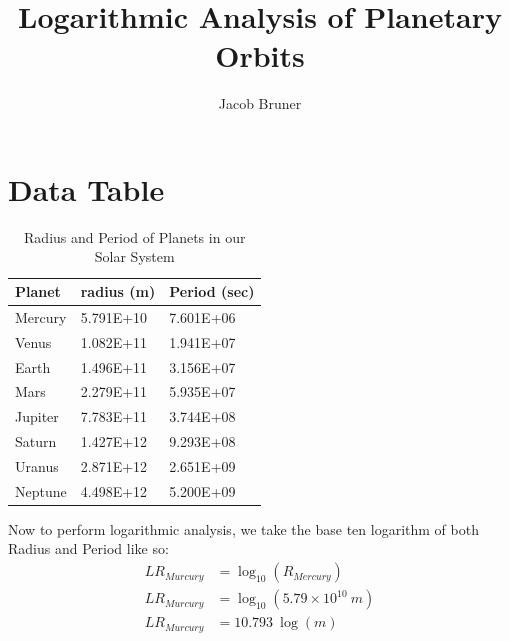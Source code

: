 \documentclass[12pt]{article}
\author{Jacob Bruner}
\title{Logarithmic Analysis of Planetary Orbits}
\begin{document}
\maketitle
\tableofcontents
\pagebreak

\section{Data Table}
\begin{table}[!ht]
    \centering
    \begin{tabular}{|l|l|l|}
    \hline
        Planet & radius (m) & Period (sec) \\ \hline \hline
        Mercury & 5.791E+10 & 7.601E+06 \\ \hline
        Venus & 1.082E+11 & 1.941E+07 \\ \hline
        Earth & 1.496E+11 & 3.156E+07 \\ \hline
        Mars & 2.279E+11 & 5.935E+07 \\ \hline
        Jupiter & 7.783E+11 & 3.744E+08 \\ \hline
        Saturn & 1.427E+12 & 9.293E+08 \\ \hline
        Uranus & 2.871E+12 & 2.651E+09 \\ \hline
        Neptune & 4.498E+12 & 5.200E+09 \\ \hline
    \end{tabular}
    \caption{Radius and Period of Planets in our Solar System \protect\footnotemark }
\end{table}

Now to perform logarithmic analysis, we take the base ten logarithm of both Radius and Period like so:
\begin{align*}
LR_{Murcury} &= \log_{10} ( R_{Mercury} ) \\
LR_{Murcury} &= \log_{10} ( 5.79 \times 10^{10}\ m) \\
LR_{Murcury} &= 10.793 \ \log (m)
\end{align*}
\end{document}
